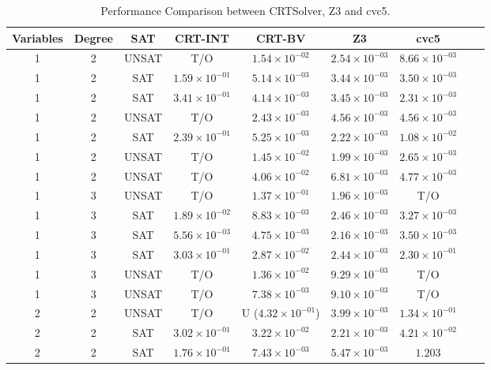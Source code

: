\begin{table}
  \caption{Performance Comparison between CRTSolver, Z3 and cvc5.}
  \label{table:results}
  \begin{tabular}{ccccccccc}
    \toprule
    Variables & Degree & SAT & CRT-INT & CRT-BV & Z3 & cvc5 \\
    \midrule
1 & 2 & UNSAT & T/O & $1.54 \times 10^{-02}$ & $2.54 \times 10^{-03}$ & $8.66 \times 10^{-03}$ \\
1 & 2 & SAT & $1.59 \times 10^{-01}$ & $5.14 \times 10^{-03}$ & $3.44 \times 10^{-03}$ & $3.50 \times 10^{-03}$ \\
1 & 2 & SAT & $3.41 \times 10^{-01}$ & $4.14 \times 10^{-03}$ & $3.45 \times 10^{-03}$ & $2.31 \times 10^{-03}$ \\
1 & 2 & UNSAT & T/O & $2.43 \times 10^{-03}$ & $4.56 \times 10^{-03}$ & $4.56 \times 10^{-03}$ \\
1 & 2 & SAT & $2.39 \times 10^{-01}$ & $5.25 \times 10^{-03}$ & $2.22 \times 10^{-03}$ & $1.08 \times 10^{-02}$ \\
1 & 2 & UNSAT & T/O & $1.45 \times 10^{-02}$ & $1.99 \times 10^{-03}$ & $2.65 \times 10^{-03}$ \\
1 & 2 & UNSAT & T/O & $4.06 \times 10^{-02}$ & $6.81 \times 10^{-03}$ & $4.77 \times 10^{-03}$ \\
1 & 3 & UNSAT & T/O & $1.37 \times 10^{-01}$ & $1.96 \times 10^{-03}$ & T/O \\
1 & 3 & SAT & $1.89 \times 10^{-02}$ & $8.83 \times 10^{-03}$ & $2.46 \times 10^{-03}$ & $3.27 \times 10^{-03}$ \\
1 & 3 & SAT & $5.56 \times 10^{-03}$ & $4.75 \times 10^{-03}$ & $2.16 \times 10^{-03}$ & $3.50 \times 10^{-03}$ \\
1 & 3 & SAT & $3.03 \times 10^{-01}$ & $2.87 \times 10^{-02}$ & $2.44 \times 10^{-03}$ & $2.30 \times 10^{-01}$ \\
1 & 3 & UNSAT & T/O & $1.36 \times 10^{-02}$ & $9.29 \times 10^{-03}$ & T/O \\
1 & 3 & UNSAT & T/O & $7.38 \times 10^{-03}$ & $9.10 \times 10^{-03}$ & T/O \\
2 & 2 & UNSAT & T/O & U ($4.32 \times 10^{-01}$) & $3.99 \times 10^{-03}$ & $1.34 \times 10^{-01}$ \\
2 & 2 & SAT & $3.02 \times 10^{-01}$ & $3.22 \times 10^{-02}$ & $2.21 \times 10^{-03}$ & $4.21 \times 10^{-02}$ \\
2 & 2 & SAT & $1.76 \times 10^{-01}$ & $7.43 \times 10^{-03}$ & $5.47 \times 10^{-03}$ & $1.203$ \\

\end{tabular}
\end{table}
